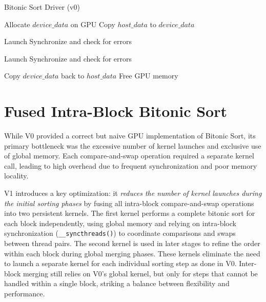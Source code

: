 \documentclass{article}
\begin{document}
\begin{algorithm}[H]
\caption{Bitonic Sort Driver (v0)}
\begin{algorithmic}[1]
    \State Allocate $device\_data$ on GPU
    \State Copy $host\_data$ to $device\_data$
    
            \State Launch 
            \State Synchronize and check for errors
        \EndFor
    \EndFor

        \State Launch 
        \State Synchronize and check for errors
    \EndIf

    \State Copy $device\_data$ back to $host\_data$
    \State Free GPU memory
\EndProcedure
\end{algorithmic}
\end{algorithm}




\section{Fused Intra-Block Bitonic Sort}

While V0 provided a correct but naive GPU implementation of Bitonic Sort, its primary bottleneck was the 
excessive number of kernel launches and exclusive use of global memory. Each compare-and-swap operation 
required a separate kernel call, leading to high overhead due to frequent synchronization and poor memory 
locality. 

V1 introduces a key optimization: it \textit{reduces the number of kernel launches during the initial sorting 
phases} by fusing all intra-block compare-and-swap operations into two persistent kernels. The first kernel 
performs a complete bitonic sort for each block independently, using global memory and relying on intra-block 
synchronization (\texttt{\_\_syncthreads()}) to coordinate comparisons and swaps between thread pairs. The second
kernel is used in later stages to refine the order within each block during global merging phases. These kernels 
eliminate the need to launch a separate kernel for each individual sorting step as done in V0. Inter-block merging
still relies on V0's global kernel, but only for steps that cannot be handled within a single block, striking a 
balance between flexibility and performance.
\end{document}

